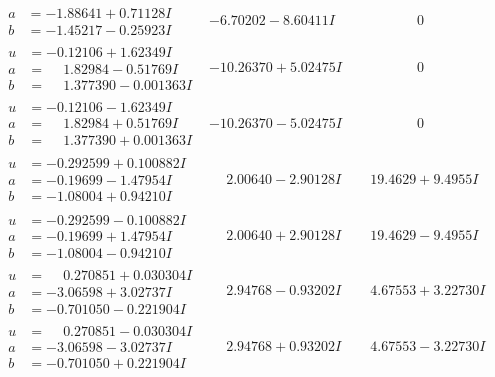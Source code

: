\documentclass[1p]{elsarticle_modified}
\theoremstyle{definition}
\begin{document}
$$\begin{array}{c|c|c}
\begin{aligned}
a &= -1.88641 + 0.71128 I \\
b &= -1.45217 - 0.25923 I\end{aligned}
 & -6.70202 - 8.60411 I & \phantom{-0.000000 } 0 \\ \hline\begin{aligned}
u &= -0.12106 + 1.62349 I \\
a &= \phantom{-}1.82984 - 0.51769 I \\
b &= \phantom{-}1.377390 - 0.001363 I\end{aligned}
 & -10.26370 + 5.02475 I & \phantom{-0.000000 } 0 \\ \hline\begin{aligned}
u &= -0.12106 - 1.62349 I \\
a &= \phantom{-}1.82984 + 0.51769 I \\
b &= \phantom{-}1.377390 + 0.001363 I\end{aligned}
 & -10.26370 - 5.02475 I & \phantom{-0.000000 } 0 \\ \hline\begin{aligned}
u &= -0.292599 + 0.100882 I \\
a &= -0.19699 - 1.47954 I \\
b &= -1.08004 + 0.94210 I\end{aligned}
 & \phantom{-}2.00640 - 2.90128 I & \phantom{-}19.4629 + 9.4955 I \\ \hline\begin{aligned}
u &= -0.292599 - 0.100882 I \\
a &= -0.19699 + 1.47954 I \\
b &= -1.08004 - 0.94210 I\end{aligned}
 & \phantom{-}2.00640 + 2.90128 I & \phantom{-}19.4629 - 9.4955 I \\ \hline\begin{aligned}
u &= \phantom{-}0.270851 + 0.030304 I \\
a &= -3.06598 + 3.02737 I \\
b &= -0.701050 - 0.221904 I\end{aligned}
 & \phantom{-}2.94768 - 0.93202 I & \phantom{-}4.67553 + 3.22730 I \\ \hline\begin{aligned}
u &= \phantom{-}0.270851 - 0.030304 I \\
a &= -3.06598 - 3.02737 I \\
b &= -0.701050 + 0.221904 I\end{aligned}
 & \phantom{-}2.94768 + 0.93202 I & \phantom{-}4.67553 - 3.22730 I \\ \hline\begin{aligned}

\end{aligned}
\end{array}$$
\end{document}
